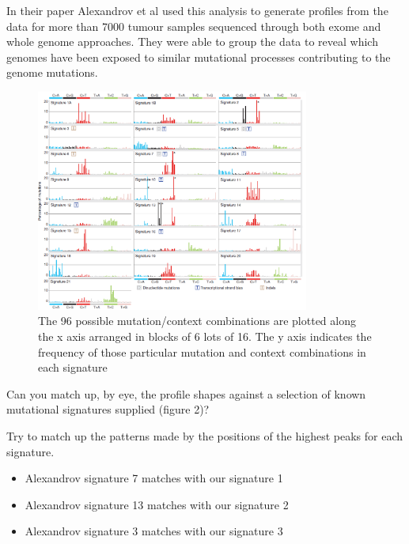 In their paper Alexandrov et al used this analysis to generate profiles from the data for
more than 7000 tumour samples sequenced through both exome and whole genome approaches.
They were able to group the data to reveal which genomes have been exposed to similar
mutational processes contributing to the genome mutations.

\begin{figure}[H]
\centering
\includegraphics[width=0.8\textwidth]{handout/alexandrov_nature.png}
\caption{The 96 possible mutation/context combinations are plotted along the x axis
arranged in blocks of 6 lots of 16. The y axis indicates the frequency
of those particular mutation and context combinations in each signature}
\label{Figure 2. 21 signature patterns identified from the analysis of more
than 7000 different tumours from Alexandrov et al. Nature 2013.}
\end{figure}

\begin{questions}
Can you match up, by eye, the profile shapes against a selection of known
mutational signatures supplied (figure 2)?

Try to match up the patterns made by the positions of the highest peaks for each signature.
\end{questions}

\begin{answer}
\begin{itemize}
\item Alexandrov signature 7 matches with our signature 1
\item Alexandrov signature 13 matches with our signature 2
\item Alexandrov signature 3 matches with our signature 3
\end{itemize}
\end{answer}

